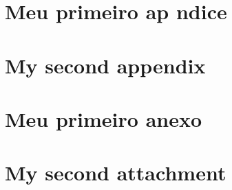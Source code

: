 \documentclass{article}
\begin{document}






\chapter{Meu primeiro ap ndice}
\chapter{My second appendix}

\anexos
\chapter{Meu primeiro anexo}
\chapter{My second attachment}

\end{document}
